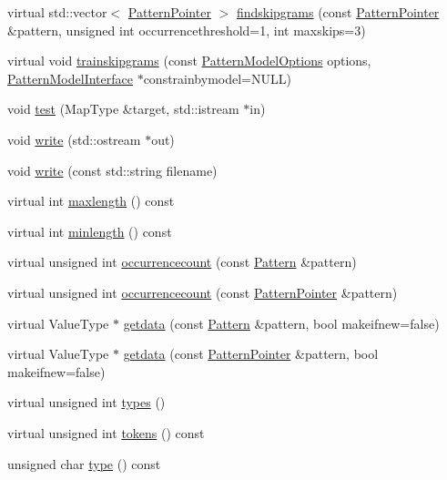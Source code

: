 \begin{DoxyCompactItemize}
virtual std\+::vector$<$ \hyperlink{classPatternPointer}{Pattern\+Pointer} $>$ \hyperlink{classPatternModel_a559c400e5b8cfe2df18381ce8cdf61d1}{findskipgrams} (const \hyperlink{classPatternPointer}{Pattern\+Pointer} \&pattern, unsigned int occurrencethreshold=1, int maxskips=3)
\item 
virtual void \hyperlink{classPatternModel_ad18615c995fc3a6336bfed45fe21f5ac}{trainskipgrams} (const \hyperlink{classPatternModelOptions}{Pattern\+Model\+Options} options, \hyperlink{classPatternModelInterface}{Pattern\+Model\+Interface} $\ast$constrainbymodel=N\+U\+L\+L)
\item 
void \hyperlink{classPatternModel_a94648d91f0bb536c3295e0ccece2a2e7}{test} (Map\+Type \&target, std\+::istream $\ast$in)
\item 
void \hyperlink{classPatternModel_abf61a21bcfd5dd0131ae394486c70e2d}{write} (std\+::ostream $\ast$out)
\item 
void \hyperlink{classPatternModel_a5c9ba026899810524d2e8254089bde66}{write} (const std\+::string filename)
\item 
virtual int \hyperlink{classPatternModel_a545fbfefef4eadb268217ec781c494bb}{maxlength} () const 
\item 
virtual int \hyperlink{classPatternModel_a7a0208745487928ecb418baeb78e810f}{minlength} () const 
\item 
virtual unsigned int \hyperlink{classPatternModel_a013725360804aac3514eb8bb436102db}{occurrencecount} (const \hyperlink{classPattern}{Pattern} \&pattern)
\item 
virtual unsigned int \hyperlink{classPatternModel_a5a945f4e01dfd36a24ea7d2e69fce91c}{occurrencecount} (const \hyperlink{classPatternPointer}{Pattern\+Pointer} \&pattern)
\item 
virtual Value\+Type $\ast$ \hyperlink{classPatternModel_a1b6c55216886cd765ab3189c24f8da2a}{getdata} (const \hyperlink{classPattern}{Pattern} \&pattern, bool makeifnew=false)
\item 
virtual Value\+Type $\ast$ \hyperlink{classPatternModel_ad1c89dc32115373dec3b1a4e3cbeb700}{getdata} (const \hyperlink{classPatternPointer}{Pattern\+Pointer} \&pattern, bool makeifnew=false)
\item 
virtual unsigned int \hyperlink{classPatternModel_a6e5ac4583443112eb1a78157aed967b5}{types} ()
\item 
virtual unsigned int \hyperlink{classPatternModel_a9e4a67d7c0136f9c9a8da56df5ffc18c}{tokens} () const 
\item 
unsigned char \hyperlink{classPatternModel_a1feab3a0fd585ca17f87b5af54fc7f61}{type} () const 

\end{DoxyCompactItemize}
